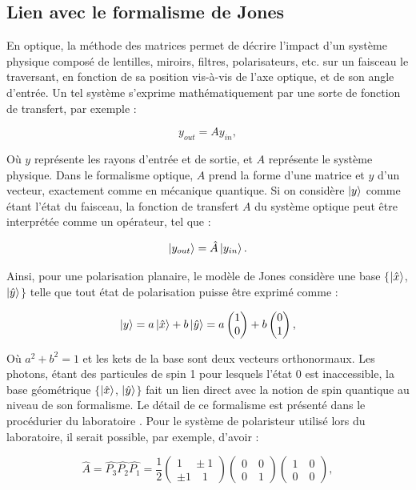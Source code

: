 \documentclass[11pt,letterpaper]{article}
\newcommand*{\Coord}[2]{%
    \begin{pmatrix} 
      #1\\ 
      #2 
    \end{pmatrix}}
\begin{document}
\subsection{Lien avec le formalisme de Jones}\label{jonesjones}

En optique, la méthode des matrices permet de décrire l'impact d'un système physique composé de lentilles, miroirs, filtres, 
polarisateurs, etc. sur un faisceau le traversant, en fonction de sa position vis-à-vis de l'axe optique, et de son angle 
d'entrée. Un tel système s'exprime mathématiquement par une sorte de fonction de transfert, par exemple : 

\begin{equation}
    y_{out} = Ay_{in},
\end{equation}

Où $y$  représente les rayons d'entrée et de sortie, et $A$ représente le système physique. Dans le formalisme optique, $A$ 
prend la forme d'une matrice et $y$ d'un vecteur, exactement comme en mécanique quantique. Si on considère $\ket{y}$ comme 
étant l'état du faisceau, la fonction de transfert $A$ du système optique peut être interprétée comme un opérateur, tel que : 

\begin{equation}
    \ket{y_{out}} = \hat{A}\ket{y_{in}}.
\end{equation}

Ainsi, pour une polarisation planaire, le modèle de Jones considère une base $\{$$\ket{\hat{x}}$, $\ket{\hat{y}}$$\}$ telle 
que tout état de polarisation puisse être exprimé comme :

\begin{equation}
    \ket{y} = a\ket{\hat{x}} + b\ket{\hat{y}} = a\Coord{1}{0} + b\Coord{0}{1},
\end{equation}

Où $a^2 + b^2 = 1$ et les kets de la base sont deux vecteurs orthonormaux. Les photons, étant des particules de spin 1 pour 
lesquels l'état 0 est inaccessible, la base géométrique $\{$$\ket{\hat{x}}$, $\ket{\hat{y}}$$\}$ fait un lien direct avec 
la notion de spin quantique au niveau de son formalisme. Le détail de ce formalisme est présenté dans le procédurier du 
laboratoire \cite{sheehy_experience_2024}. Pour le système de polaristeur utilisé lors du laboratoire, il serait possible, par
exemple, d'avoir  : 

\begin{equation*}
    \hat{A} = \hat{P_3}\hat{P_2}\hat{P_1} = \frac{1}{2}\Coord{1 \quad \pm 1}{\pm 1 \quad 1}\Coord{0 \quad 0}{0 \quad 1}\Coord{1 \quad 0}{0 \quad 0},
\end{equation*}
\end{document}
